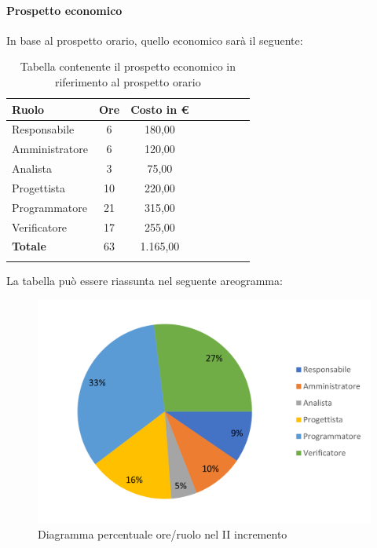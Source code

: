 \paragraph{Prospetto economico}
In base al prospetto orario, quello economico sarà il seguente:

\begin{longtable}{|l|c|c|c|c|c|c|c|}
	\hline
	\rowcolor{lighter-grayer}
	\textbf{Ruolo}  & \textbf{Ore} & \textbf{Costo in €} \\
	\hline
	\endfirsthead

	\hline
	Responsabile    & 6            & 180,00              \\
	\hline
	\hline
	Amministratore  & 6           & 120,00              \\
	\hline
	\hline
	Analista        & 3           & 75,00              \\
	\hline
	\hline
	Progettista     & 10            & 220,00                   \\
	\hline
	\hline
	Programmatore   & 21            & 315,00                   \\
	\hline
	\hline
	Verificatore    & 17           & 255,00              \\
	\hline
	\hline
	\textbf{Totale} & 63           & 1.165,00            \\
	\hline
	\rowcolor{white}
	\caption{Tabella contenente il prospetto economico in riferimento al prospetto orario}
\end{longtable}
\pagebreak

La tabella può essere riassunta nel seguente areogramma:
\begin{figure}[H]
	\centering
	\includegraphics[width=0.8\linewidth]{res/images/preventivo/dettaglio_poc/2-2.png}
	\caption{Diagramma percentuale ore/ruolo nel II incremento}
	\label{fig:diagramma costi ruolo II incremento}
\end{figure}

